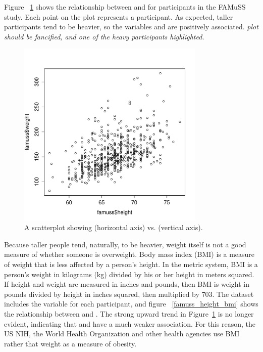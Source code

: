 \begin{doublespace}
Figure ~\ref{famuss_height_weight} shows the relationship between  and  for participants in the FAMuSS study.  Each point on the plot represents a participant. As expected, taller participants tend to be heavier, so the variables  and  are positively associated.  \textit{plot should be fancified, and one of the heavy participants highlighted.}


\begin{figure}
\centering
\includegraphics[width=0.8\textwidth]
{ch_intro_to_data_oi_biostat/figures/famussHeightVsWeight/famussHeightVsWeight}
\caption{A scatterplot showing  (horizontal axis) vs.  (vertical axis). }
\label{famuss_height_weight}
\end{figure}

Because taller people tend, naturally, to be heavier, weight itself is not a good measure of whether someone is overweight.  Body mass index (BMI) is a measure of weight that is less affected by a person's height.  In the metric system, BMI is a person's weight in kilograms (kg) divided by his or her height in meters squared.  If height and weight are measured in inches and pounds, then BMI is weight in pounds divided by height in inches squared, then multiplied by 703. The  dataset includes the variable  for each participant, and figure ~\ref{famuss_height_bmi} shows the relationship between  and .  The strong upward trend in Figure~\ref{famuss_height_weight} is no longer evident, indicating that  and  have a much weaker association.  For this reason, the US NIH, the World Health Organization and other health agencies use BMI rather that weight as a measure of obesity.


\end{doublespace}
